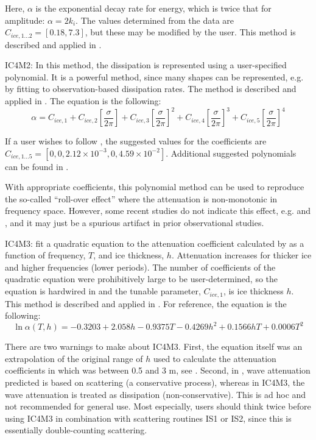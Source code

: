 \noindent Here, $\alpha$ is the exponential decay rate for energy, which is twice that for amplitude: $\alpha = 2k_i$. The values determined from the data are ${C_{ice,1...2}}=[0.18, 7.3]$, but these may be modified by the user. This method is described and applied in \cite{rep:CR17}.

{\code IC4M2}: In this method, the dissipation is represented using a user-specified polynomial. It is a powerful method, since many shapes can be represented, e.g. by fitting to observation-based dissipation rates. The method is described and applied in \cite{rep:CR17}. The equation is the following:
\begin{equation}\label{eq:ice2}
  {\alpha} = C_{ice,1} + C_{ice,2}\left[{\frac{\sigma}{2\pi}}\right] + C_{ice,3}\left[{\frac{\sigma}{2\pi}}\right]^2 + C_{ice,4}\left[{\frac{\sigma}{2\pi}}\right]^3 + C_{ice,5}\left[{\frac{\sigma}{2\pi}}\right]^4
\end{equation}

\noindent
If a user wishes to follow \cite{art:MBK14}, the suggested values for the coefficients are ${C_{ice,1...5}}=[0, 0, 2.12\times 10^{-3}, 0, 4.59\times 10^{-2}]$. Additional suggested polynomials can be found in \cite{rep:RMK18}.

With appropriate coefficients, this polynomial method can be used to reproduce the so-called “roll-over effect” where the attenuation is non-monotonic in frequency space. However, some recent studies do not indicate this effect, e.g. \cite{art:RTS16} and \cite{art:LK17}, and it may just be a spurious artifact in prior observational studies.

{\code IC4M3}: \cite{art:HT15} fit a quadratic equation to the attenuation coefficient calculated by \cite{art:KM08} as a function of frequency, $T$, and ice thickness, $h$. Attenuation increases for thicker ice and higher frequencies (lower periods). The number of  coefficients of the quadratic equation were prohibitively large to be user-determined, so the equation is hardwired in and the tunable parameter, ${C_{ice,1}}$, is ice thickness $h$. This method is described and applied in \cite{rep:CR17}. For reference, the equation is the following:
\begin{equation}\label{eq:ice3}
  {\ln{\alpha(T,h)}} = -0.3203 + 2.058h - 0.9375T - 0.4269h^2 + 0.1566hT + 0.0006T^2
\end{equation}

\noindent
There are two warnings to make about {\code IC4M3}. First, the equation itself was an extrapolation of the original range of $h$ used to calculate the attenuation coefficients in \cite{art:KM08} which was between 0.5 and 3 m, see \cite{art:HT15}. Second, in \cite{art:KM08}, wave attenuation predicted is based on scattering (a conservative process), whereas in {\code IC4M3}, the wave attenuation is treated as dissipation (non-conservative). This is ad hoc and not recommended for general use. Most especially, users should think twice before using {\code IC4M3} in combination with scattering routines {\code IS1} or {\code IS2}, since this is essentially double-counting scattering.


